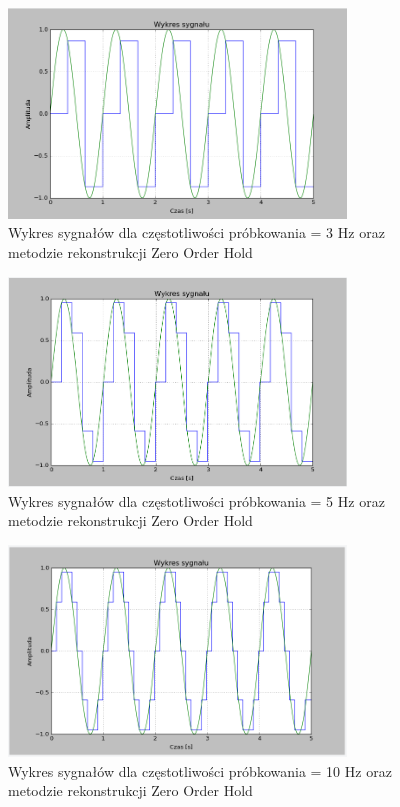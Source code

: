 \documentclass{article}
\begin{document}
    \begin{figure}[h!]
        \centering
        \includegraphics[width=0.8\textwidth]{img/1/zoh3.png}
        \caption{Wykres sygnałów dla częstotliwości próbkowania = 3 Hz oraz metodzie rekonstrukcji Zero Order Hold}
    \end{figure}
    \FloatBarrier

    \begin{figure}[h!]
        \centering
        \includegraphics[width=0.8\textwidth]{img/1/zoh5.png}
        \caption{Wykres sygnałów dla częstotliwości próbkowania = 5 Hz oraz metodzie rekonstrukcji Zero Order Hold}
    \end{figure}
    \FloatBarrier

    \begin{figure}[h!]
        \centering
        \includegraphics[width=0.8\textwidth]{img/1/zho10.png}
        \caption{Wykres sygnałów dla częstotliwości próbkowania = 10 Hz oraz metodzie rekonstrukcji Zero Order Hold}
    \end{figure}
    \FloatBarrier
\end{document}
